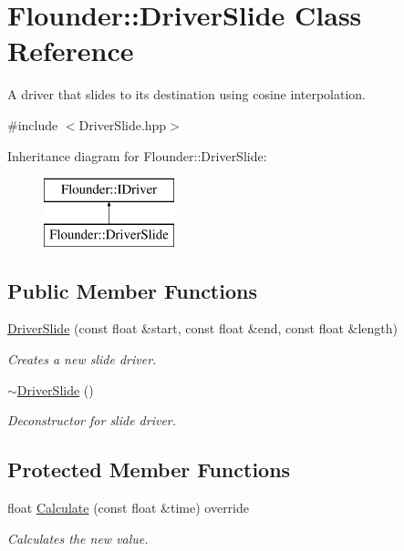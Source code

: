 \hypertarget{class_flounder_1_1_driver_slide}{}\section{Flounder\+:\+:Driver\+Slide Class Reference}
\label{class_flounder_1_1_driver_slide}


A driver that slides to its destination using cosine interpolation.  




{\ttfamily \#include $<$Driver\+Slide.\+hpp$>$}

Inheritance diagram for Flounder\+:\+:Driver\+Slide\+:\begin{figure}[H]
\begin{center}
\leavevmode
\includegraphics[height=2.000000cm]{class_flounder_1_1_driver_slide}
\end{center}
\end{figure}
\subsection*{Public Member Functions}
\begin{DoxyCompactItemize}
\item 
\hyperlink{class_flounder_1_1_driver_slide_ab0da83a97d2f15f50900afa16c0ec965}{Driver\+Slide} (const float \&start, const float \&end, const float \&length)
\begin{DoxyCompactList}\small\item\em Creates a new slide driver. \end{DoxyCompactList}\item 
\hyperlink{class_flounder_1_1_driver_slide_a6c3c2e6298eea6606497a63f90729118}{$\sim$\+Driver\+Slide} ()
\begin{DoxyCompactList}\small\item\em Deconstructor for slide driver. \end{DoxyCompactList}\end{DoxyCompactItemize}
\subsection*{Protected Member Functions}
\begin{DoxyCompactItemize}
\item 
float \hyperlink{class_flounder_1_1_driver_slide_a32dcca0cbd41ff1c4e5e4eb494f4cf07}{Calculate} (const float \&time) override
\begin{DoxyCompactList}\small\item\em Calculates the new value. \end{DoxyCompactList}\end{DoxyCompactItemize}
